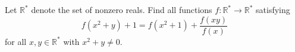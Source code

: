 Let $\mathbb R^\ast$ denote the set of nonzero reals.  Find all functions $f: \mathbb R^\ast \to \mathbb R^\ast$ satisfying \[ f(x^2+y)+1=f(x^2+1)+\frac{f(xy)}{f(x)} \] for all $x,y \in \mathbb R^\ast$ with $x^2+y\neq 0$.

